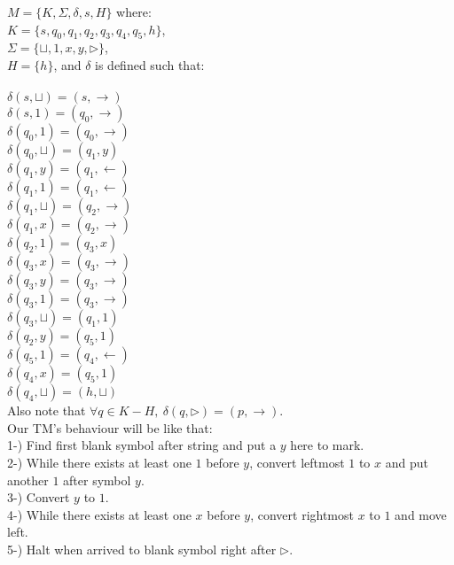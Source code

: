 \documentclass[12pt]{article}
\begin{document}
$M      = \{K, \Sigma, \delta, s, H\}$ where:\\
$K      = \{s, q_0, q_1, q_2, q_3, q_4, q_5, h\}$,\\
$\Sigma = \{\sqcup, 1, x, y, \triangleright   \}$,\\
$H      = \{h                                 \}$, and $\delta$ is defined such that:\\ \\
$\delta(s, \sqcup) = (s, \rightarrow)$\\
$\delta(s, 1) = (q_0, \rightarrow)$\\
$\delta(q_0, 1) = (q_0, \rightarrow)$\\
$\delta(q_0, \sqcup) = (q_1, y)$\\
$\delta(q_1, y) = (q_1, \leftarrow)$\\
$\delta(q_1, 1) = (q_1, \leftarrow)$\\
$\delta(q_1, \sqcup) = (q_2, \rightarrow)$\\
$\delta(q_1, x) = (q_2, \rightarrow)$\\
$\delta(q_2, 1) = (q_3, x)$\\
$\delta(q_3, x) = (q_3, \rightarrow)$\\
$\delta(q_3, y) = (q_3, \rightarrow)$\\
$\delta(q_3, 1) = (q_3, \rightarrow)$\\
$\delta(q_3, \sqcup) = (q_1, 1)$\\
$\delta(q_2, y) = (q_5, 1)$\\
$\delta(q_5, 1) = (q_4, \leftarrow)$\\
$\delta(q_4, x) = (q_5, 1)$\\
$\delta(q_4, \sqcup) = (h, \sqcup)$\\

Also note that $\forall q \in K - H,\ \delta(q, \triangleright) = (p, \rightarrow).$ \\

Our TM's behaviour will be like that:\\
1-) Find first blank symbol after string and put a $y$ here to mark.\\
2-) While there exists at least one $1$ before $y$, convert leftmost $1$ to $x$ and put
 another $1$ after symbol $y$.\\
3-) Convert $y$ to $1$.\\
4-) While there exists at least one $x$ before $y$, convert rightmost $x$ to $1$ and
 move left.\\
5-) Halt when arrived to blank symbol right after $\triangleright$.
\end{document}
